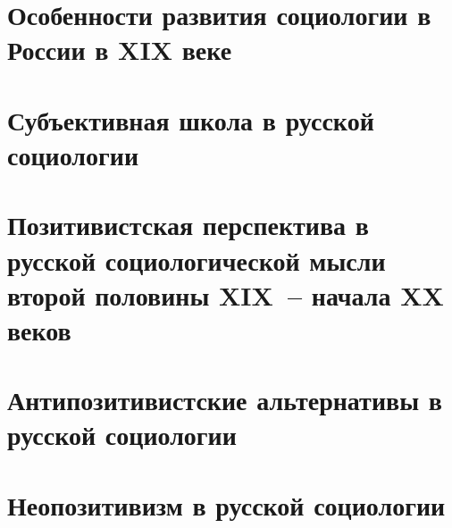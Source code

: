 
  \section{Особенности развития социологии в России в XIX веке}

  \section{Субъективная школа в русской социологии}

  \section{Позитивистская перспектива в русской социологической мысли второй
    половины XIX~-- начала XX веков}

  \section{Антипозитивистские альтернативы в русской социологии}

  \section{Неопозитивизм в русской социологии}
